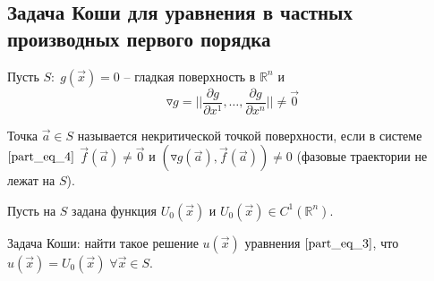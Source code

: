 \documentclass[a4paper, 12pt]{article}
\begin{document}
    \subsection{Задача Коши для уравнения в частных производных первого порядка}

    Пусть $S: \; g \left( \overrightarrow{x} \right) = 0$ -- гладкая поверхность в $\mathbb{R}^n$ и 
    \begin{equation*}
        \triangledown g = \bigg| \bigg| \frac{\partial g}{\partial x^{1}}, \dots, \frac{\partial g}{\partial x^{n}} \bigg| \bigg| \neq \overrightarrow{0}
    \end{equation*}

    \begin{definition}
        Точка $\overrightarrow{a} \in S$ называется некритической точкой поверхности, если в системе $\eqref{part_eq_4}$ $\overrightarrow{f} \left( \overrightarrow{a} \right) \neq \overrightarrow{0}$ и $ \left( \triangledown g \left( \overrightarrow{a} \right), \overrightarrow{f} \left( \overrightarrow{a} \right) \right) \neq 0$  (фазовые траектории не лежат на $S$).
    \end{definition}

    Пусть на $S$ задана функция $U_0 \left( \overrightarrow{x} \right)$ и $U_0 \left( \overrightarrow{x} \right) \in C^1 \left( \mathbb{R}^n \right)$.

    Задача Коши: найти такое решение $u \left( \overrightarrow{x} \right)$ уравнения $\eqref{part_eq_3}$, что $u \left( \overrightarrow{x} \right) = U_0 \left( \overrightarrow{x} \right) \; \forall \overrightarrow{x} \in S$.
    
\end{document}
